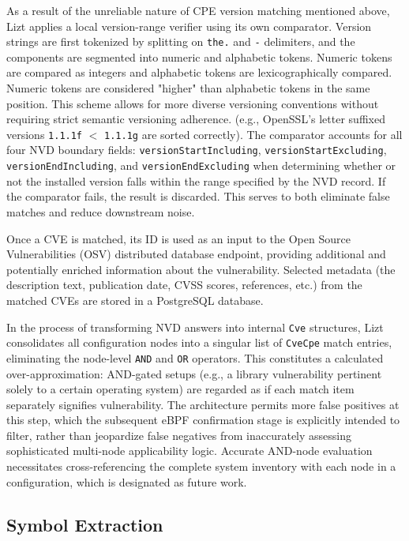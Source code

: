 \documentclass[conference]{IEEEtran}
\begin{document}
As a result of the unreliable nature of CPE version matching mentioned above, Lizt applies a local version-range verifier using its own comparator.
Version strings are first tokenized by splitting on \texttt{the.} and \texttt{-} delimiters, and the components are segmented into numeric and alphabetic tokens.
Numeric tokens are compared as integers and alphabetic tokens are lexicographically compared.
Numeric tokens are considered "higher" than alphabetic tokens in the same position.
This scheme allows for more diverse versioning conventions without requiring strict semantic versioning adherence.
(e.g., OpenSSL's letter suffixed versions \texttt{1.1.1f} $<$ \texttt{1.1.1g} are sorted correctly).
The comparator accounts for all four NVD boundary fields: \texttt{versionStartIncluding}, \texttt{versionStartExcluding}, \texttt{versionEndIncluding}, and \texttt{versionEndExcluding} when determining whether or not the installed version falls within the range specified by the NVD record.
If the comparator fails, the result is discarded.
This serves to both eliminate false matches and reduce downstream noise.

Once a CVE is matched, its ID is used as an input to the Open Source Vulnerabilities (OSV) distributed database endpoint, providing additional and potentially enriched information about the vulnerability.
Selected metadata (the description text, publication date, CVSS scores, references, etc.) from the matched CVEs are stored in a PostgreSQL database.

In the process of transforming NVD answers into internal \texttt{Cve} structures, Lizt consolidates all configuration nodes into a singular list of \texttt{CveCpe} match entries, eliminating the node-level \texttt{AND} and \texttt{OR} operators.
This constitutes a calculated over-approximation: AND-gated setups (e.g., a library vulnerability pertinent solely to a certain operating system) are regarded as if each match item separately signifies vulnerability.
The architecture permits more false positives at this step, which the subsequent eBPF confirmation stage is explicitly intended to filter, rather than jeopardize false negatives from inaccurately assessing sophisticated multi-node applicability logic.
Accurate AND-node evaluation necessitates cross-referencing the complete system inventory with each node in a configuration, which is designated as future work.

\subsection{Symbol Extraction}
\end{document}
